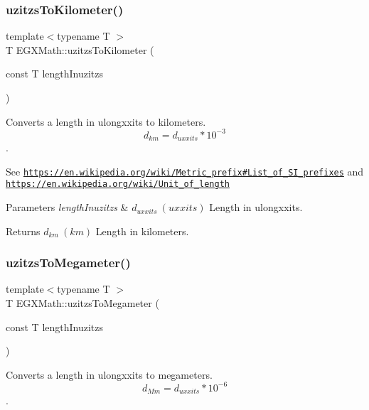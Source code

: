 \subsubsection{\texorpdfstring{uzitzs\+To\+Kilometer()}{uzitzsToKilometer()}}
{\footnotesize\ttfamily template$<$typename T $>$ \\
T E\+G\+X\+Math\+::uzitzs\+To\+Kilometer (\begin{DoxyParamCaption}\item[{const T}]{length\+Inuzitzs }\end{DoxyParamCaption})}



Converts a length in ulongxxits to kilometers. \[ d_{km}=d_{uxxits} * 10^{-3} \]. 

See \href{https://en.wikipedia.org/wiki/Metric_prefix#List_of_SI_prefixes}{\tt https\+://en.\+wikipedia.\+org/wiki/\+Metric\+\_\+prefix\#\+List\+\_\+of\+\_\+\+S\+I\+\_\+prefixes} and \href{https://en.wikipedia.org/wiki/Unit_of_length}{\tt https\+://en.\+wikipedia.\+org/wiki/\+Unit\+\_\+of\+\_\+length} 
\begin{DoxyParams}{Parameters}
{\em length\+Inuzitzs} & $ d_{uxxits}\ (uxxits)$ Length in ulongxxits. \\
\hline
\end{DoxyParams}
\begin{DoxyReturn}{Returns}
$ d_{km}\ (km)$ Length in kilometers. 
\end{DoxyReturn}
\mbox{\label{group___e_g_x_math-_conversions-_length_conversions-uzitzs-_s_i_ga237ffeef9137de3dd2cf5ae0eacf973e}} 
\subsubsection{\texorpdfstring{uzitzs\+To\+Megameter()}{uzitzsToMegameter()}}
{\footnotesize\ttfamily template$<$typename T $>$ \\
T E\+G\+X\+Math\+::uzitzs\+To\+Megameter (\begin{DoxyParamCaption}\item[{const T}]{length\+Inuzitzs }\end{DoxyParamCaption})}



Converts a length in ulongxxits to megameters. \[ d_{Mm}=d_{uxxits} * 10^{-6} \]. 

